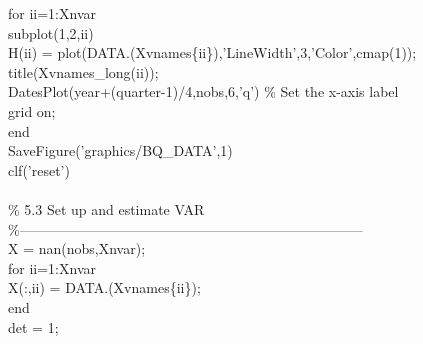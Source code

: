 \hspace{1mm}\textcolor{matlabblue}{for} ii=1:Xnvar \\ 
\hspace{1mm}\hspace{5mm} subplot(1,2,ii) \\ 
\hspace{1mm}\hspace{5mm} H(ii) = plot(DATA.(Xvnames\{ii\}),\textcolor{matlabpurple}{'LineWidth'},3,\textcolor{matlabpurple}{'Color'},cmap(1)); \\ 
\hspace{1mm}\hspace{5mm} title(Xvnames\_long(ii));  \\ 
\hspace{1mm}\hspace{5mm} DatesPlot(year+(quarter-1)/4,nobs,6,\textcolor{matlabpurple}{'q'}) \textcolor{matlabgreen}{\% Set the x-axis label  }\\ 
\hspace{1mm}\hspace{5mm} grid on;  \\ 
\hspace{1mm}\textcolor{matlabblue}{end} \\ 
\hspace{1mm}SaveFigure(\textcolor{matlabpurple}{'graphics/BQ\_DATA'},1) \\ 
\hspace{1mm}clf(\textcolor{matlabpurple}{'reset'}) \\ 
\hspace{1mm} \\ 
\hspace{1mm}\textcolor{matlabgreen}{\% 5.3 Set up and estimate VAR }\\ 
\hspace{1mm}\textcolor{matlabgreen}{\%--------------------------------------------------------------------------  }\\ 
\hspace{1mm}X = nan(nobs,Xnvar); \\ 
\hspace{1mm}\textcolor{matlabblue}{for} ii=1:Xnvar \\ 
\hspace{1mm}\hspace{5mm} X(:,ii) = DATA.(Xvnames\{ii\}); \\ 
\hspace{1mm}\textcolor{matlabblue}{end} \\ 
\hspace{1mm}det = 1; \\ 
